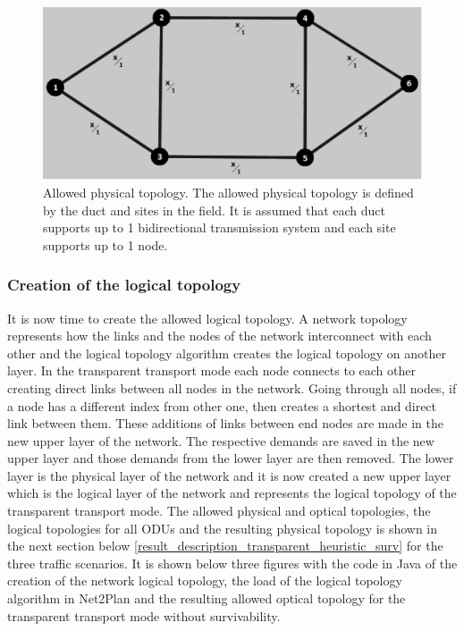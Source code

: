 \begin{figure}[H]
\centering
\includegraphics[width=12cm]{sdf/heuristic/transparent_survivability/figures/allowed_physical}
\caption{Allowed physical topology. The allowed physical topology is defined by the duct and sites in the field. It is assumed that each duct supports up to 1 bidirectional transmission system and each site supports up to 1 node.}
\label{allowed_physical_surv_transp}
\end{figure}

\subsubsection{Creation of the logical topology}

\vspace{11pt}
It is now time to create the allowed logical topology. A network topology represents how the links and the nodes of the network interconnect with each other and the logical topology algorithm creates the logical topology on another layer. In the transparent transport mode each node connects to each other creating direct links between all nodes in the network. Going through all nodes, if a node has a different index from other one, then creates a shortest and direct link between them. These additions of links between end nodes are made in the new upper layer of the network. The respective demands are saved in the new upper layer and those demands from the lower layer are then removed. The lower layer is the physical layer of the network and it is now created a new upper layer which is the logical layer of the network and represents the logical topology of the transparent transport mode.
The allowed physical and optical topologies, the logical topologies for all ODUs and the resulting physical topology is shown in the next section below \ref{result_description_transparent_heuristic_surv} for the three traffic scenarios. It is shown below three figures with the code in Java of the creation of the network logical topology, the load of the logical topology algorithm in Net2Plan and the resulting allowed optical topology for the transparent transport mode without survivability.


